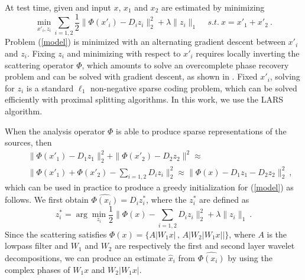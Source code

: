 At test time, given and input $x$, $x_1$ and $x_2$ are estimated by minimizing
\begin{equation}
\label{model}
\min_{x'_i, z_i} \sum_{i=1,2} \frac{1}{2} \| \Phi(x'_i) - D_i z_i \|_2^2 + \lambda \| z_i \|_1 \quad\,s.t. ~x=x'_1 + x'_2~.
\end{equation}
Problem (\ref{model}) is minimized with an alternating gradient descent between $x'_i$ and $z_i$. 
Fixing $z_i$ and minimizing with respect to $x'_i$ requires locally inverting the scattering 
operator $\Phi$, which amounts to solve an overcomplete phase recovery problem and 
can be solved with gradient descent, as shown in \cite{bruna2013audio}. 
Fixed $x'_i$, solving for $z_i$ is a standard $\ell_1$ non-negative sparse coding problem, which can be solved 
efficiently with proximal splitting algorithms. In this work, we use the LARS algorithm. 
 
When the analysis operator $\Phi$ is able to produce sparse representations of the sources, 
then 
{\small
\begin{eqnarray*}
&&\| \Phi(x'_1) - D_1 z_1 \|_2^2 + \| \Phi(x'_2) - D_2 z_2 \|^2 \approx \\
&&\| \Phi(x'_1) + \Phi(x'_2) - \sum_{i=1,2} D_i z_i \|_2^2  \approx \| \Phi(x) - D_1 z_1 - D_2 z_2 \|_2^2 ~,
\end{eqnarray*}}
which can be used in practice to produce a greedy initialization for (\ref{model}) as follows. 
We first obtain $\widehat{\Phi(x_i)}= D_i z^*_i$, where the $z^*_i$ are defined as 
$$z^*_i = \arg\min_{z_i} \frac{1}{2}\| \Phi(x) - \sum_{i=1,2} D_i z_i \|_2^2 +\lambda \| z_i \|_1~.$$
Since the scattering satisfies {\small $\Phi(x)= \{ A |W_1 x | \,,\, A | W_2 | W_1 x | | \}$}, 
where $A$ is the lowpass filter and $W_1$ and $W_2$ are respectively the first and 
second layer wavelet decompositions, we can produce an estimate $\widehat{x}_i$ from 
$\widehat{\Phi(x_i)}$ by using the complex phases of $W_1 x$ and $W_2 |W_1 x|$.



%
%
%
%
%
%
